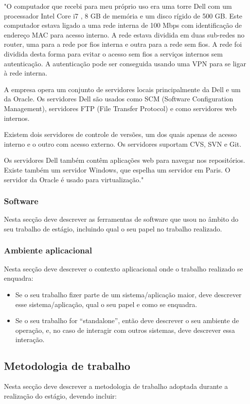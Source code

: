 \documentclass{article}
\begin{document}
"O computador que recebi para meu próprio uso era uma torre Dell com um processador Intel Core i7 , 8 GB de memória e um disco rígido de 500 GB. Este computador estava ligado a uma rede interna de 100 Mbps com identificação de endereço MAC para acesso interno. A rede estava dividida em duas sub-redes no router, uma para a rede por fios interna e outra para a rede sem fios. A rede foi dividida desta forma para evitar o acesso sem fios a serviços internos sem autenticação. A autenticação pode ser conseguida usando uma VPN para se ligar à rede interna.

A empresa opera um conjunto de servidores locais principalmente da Dell e um da Oracle. Os servidores Dell são usados como SCM (Software Configuration Management),  servidores FTP (File Transfer Protocol) e como servidores web internos. 

Existem dois servidores de controle de versões, um dos quais apenas de acesso interno e o outro com acesso externo. Os servidores suportam CVS, SVN e Git.

Os servidores Dell também contêm aplicações web para navegar nos repositórios. Existe também um servidor Windows, que espelha um servidor em Paris. O servidor da Oracle é usado para virtualização."


\subsubsection{Software}
Nesta secção deve descrever as ferramentas de software que usou no âmbito do seu trabalho de estágio, incluindo qual o seu papel no trabalho realizado.

\subsubsection{Ambiente aplicacional}
Nesta secção deve descrever o contexto aplicacional onde o trabalho realizado se enquadra:

\begin{itemize}
\item Se o seu trabalho fizer parte de um sistema/aplicação maior, deve descrever esse sistema/aplicação, qual o seu papel e como se enquadra. 
\item Se o seu trabalho for “standalone”, então deve descrever o seu ambiente de operação, e, no caso de interagir com outros sistemas, deve descrever essa interação.
\end{itemize}


\subsection{Metodologia de trabalho}
Nesta secção deve descrever a metodologia de trabalho adoptada durante a realização do estágio, devendo incluir:
\end{document}
